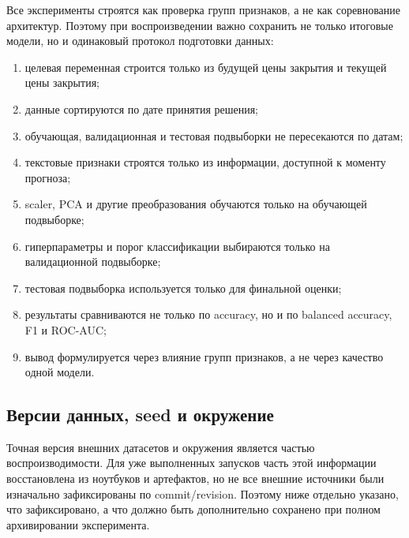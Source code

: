 Все эксперименты строятся как проверка групп признаков, а не как соревнование архитектур. Поэтому при воспроизведении важно сохранить не только итоговые модели, но и одинаковый протокол подготовки данных:

\begin{enumerate}
    \item целевая переменная строится только из будущей цены закрытия и текущей цены закрытия;
    \item данные сортируются по дате принятия решения;
    \item обучающая, валидационная и тестовая подвыборки не пересекаются по датам;
    \item текстовые признаки строятся только из информации, доступной к моменту прогноза;
    \item scaler, PCA и другие преобразования обучаются только на обучающей подвыборке;
    \item гиперпараметры и порог классификации выбираются только на валидационной подвыборке;
    \item тестовая подвыборка используется только для финальной оценки;
    \item результаты сравниваются не только по accuracy, но и по balanced accuracy, F1 и ROC-AUC;
    \item вывод формулируется через влияние групп признаков, а не через качество одной модели.
\end{enumerate}

\subsection*{Версии данных, seed и окружение}

Точная версия внешних датасетов и окружения является частью воспроизводимости. Для уже выполненных запусков часть этой информации восстановлена из ноутбуков и артефактов, но не все внешние источники были изначально зафиксированы по commit/revision. Поэтому ниже отдельно указано, что зафиксировано, а что должно быть дополнительно сохранено при полном архивировании эксперимента.

